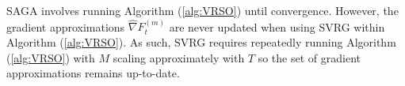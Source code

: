 SAGA involves running Algorithm (\ref{alg:VRSO}) until convergence. However, the gradient approximations $\widehat \nabla F_{t}^{(m)}$ are never updated when using SVRG within Algorithm (\ref{alg:VRSO}). As such, SVRG requires repeatedly running Algorithm (\ref{alg:VRSO}) with $M$ scaling approximately with $T$ so the set of gradient approximations remains up-to-date.

